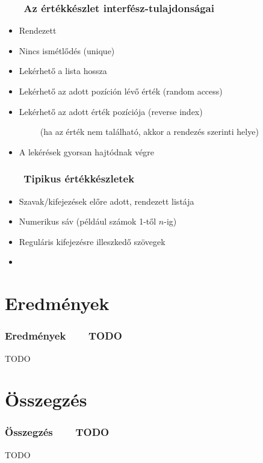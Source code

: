 \documentclass{beamer}
\newcommand{\condpause}{\pause}
\newcommand{\slidetitle}[2]{\frametitle{{\small #1 ~ \ding{226} ~ } \normalsize #2}}
\begin{document}
\begin{frame}
    \slidetitle{\sectionshorttitle}{Az értékkészlet interfész-tulajdonságai}
    
    \begin{itemize}
        \setlength\itemsep{1em}
        \item Rendezett \condpause
        \item Nincs ismétlődés (unique) \condpause
        \item Lekérhető a lista hossza \condpause
        \item Lekérhető az adott pozíción lévő érték (random access) \condpause
        \item Lekérhető az adott érték pozíciója (reverse index) \condpause \par
              ~ ~ ~ (ha az érték nem található, akkor a rendezés szerinti helye) \condpause
        \item A lekérések gyorsan hajtódnak végre
    \end{itemize}
\end{frame}

\begin{frame}
    \slidetitle{\sectionshorttitle}{Tipikus értékkészletek}
    
    \begin{itemize}
        \setlength\itemsep{1em}
        \item Szavak/kifejezések előre adott, rendezett listája \condpause
        \item Numerikus sáv (például számok 1-től $n$-ig) \condpause
        \item Reguláris kifejezésre illeszkedő szövegek \condpause
        \item 
    \end{itemize}
\end{frame}

\section{Eredmények}
\def\sectionshorttitle{Eredmények}

\begin{frame}
    \slidetitle{\sectionshorttitle}{TODO}
    TODO
\end{frame}

\section{Összegzés}
\def\sectionshorttitle{Összegzés}

\begin{frame}
    \slidetitle{\sectionshorttitle}{TODO}
    TODO
\end{frame}
\end{document}
